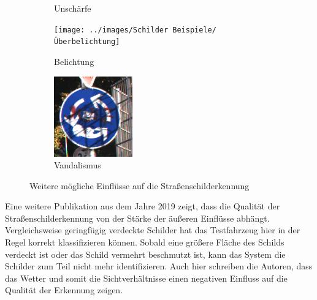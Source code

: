 \begin{figure}[H]
\begin{subfigure}[b]{0.125\textwidth}
       \caption{Unschärfe}
       \label{fig:motion-blur}
   \end{subfigure}
   \hspace{3em}%
   \begin{subfigure}[b]{0.125\textwidth}
       \centering
       \texttt{[image: ../images/Schilder Beispiele/Überbelichtung]}
       \caption{Belichtung}
       \label{fig:ueberbelichtung}
   \end{subfigure}
   \hspace{3em}%
   \begin{subfigure}[b]{0.125\textwidth}
    \centering
    \includegraphics[height=\textwidth]{../images/Schilder Beispiele/Vandalismus.png}
    \caption{Vandalismus}
    \label{fig:vandalism}
   \end{subfigure}
      \caption{Weitere mögliche Einflüsse auf die Straßenschilderkennung \cite{GTSRB} \cite{schnee-schild}}
      \label{fig:einfluesse-strscherkennung2}
\end{figure}

Eine weitere Publikation aus dem Jahre 2019 zeigt, dass die Qualität der Straßenschilderkennung von der Stärke der äußeren Einflüsse abhängt. Vergleichsweise geringfügig verdeckte Schilder hat das Testfahrzeug hier in der Regel korrekt klassifizieren können. Sobald eine größere Fläche des Schilds verdeckt ist oder das Schild vermehrt beschmutzt ist, kann das System die Schilder zum Teil nicht mehr identifizieren. Auch hier schreiben die Autoren, dass das Wetter und somit die Sichtverhältnisse einen negativen Einfluss auf die Qualität der Erkennung zeigen. \cite{traffic-sign-anomalies}

